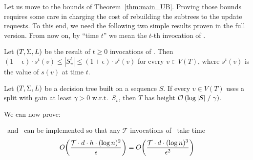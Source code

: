 
Let us move to the bounds of Theorem~\ref{thm:main_UB}. Proving those bounds requires some care in charging the cost of rebuilding the subtrees to the update requests. To this end, we need the following two simple results proven in the full version. From now on, by ``time $t$'' we mean the $t$-th invocation of \AlgoUpdate.
\begin{lemma}\label{lem:counter}
Let $(T,\Sigma,L)$ be the result of $t \ge 0$ invocations of \AlgoUpdate. Then $(1-\epsilon) \cdot s^t(v) \leq |S^t_v| \leq (1+\epsilon) \cdot  s^t(v)$ for every $v \in V(T)$, where $s^t(v)$ is the value of $s(v)$ at time $t$.%
\end{lemma}
\begin{lemma}\label{lem:log_height}
Let $(T,\Sigma,L)$ be a decision tree built on a sequence $S$. If every $v \in V(T)$ uses a split with gain at least $\gamma > 0$ w.r.t.\ $S_v$, then $T$ has height  $\mathcal{O} \left( \log |S|  \;/\; {\gamma}  \right)  $. %
\end{lemma}
We can now prove:
\begin{lemma}\label{lem:amtime}
\AlgoBuild\ and \AlgoUpdate\ can be implemented so that any $\mathcal{T}$ invocations of \AlgoUpdate\ take time 
\begin{align}
    O\!\left(\frac{\mathcal{T} \cdot d \cdot h \cdot (\log n)^2}{\epsilon}\right) = O\!\left(\frac{\mathcal{T} \cdot d \cdot (\log n)^3}{\epsilon^2}\right)
\end{align}
\end{lemma}
